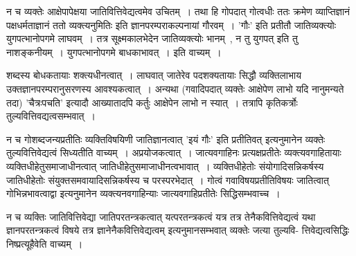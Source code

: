 				न च व्यक्तेः आक्षेपापेक्षया जातिवित्तिवेद्यत्वमेव उचितम्~। तथा हि गोपदात् गोत्वधीः ततः क्रमेण व्याप्तिज्ञानं पक्षधर्मताज्ञानं ततो व्यक्त्यनुमितिः इति ज्ञानपरम्पराकल्पनायां गौरवम्~। 'गौः' इति प्रतीतौ जातिव्यक्त्योः युगपत्भानोपगमे लाघवम्~। तत्र सूक्ष्मकालभेदेन जातिव्यक्त्योः भानम्~, न तु युगपत् इति तु नाशङ्कनीयम्~। युगपत्भानोपगमे बाधकाभावत्~। इति वाच्यम्~।

				शब्दस्य बोधकतायाः शक्त्यधीनत्वात्~। लाघवात् जातेरेव पदशक्यतायाः सिद्धौ व्यक्तिलाभाय उक्तज्ञानपरम्परानुसरणस्य आवश्यकत्वात्~। अन्यथा (गवादिपदात् व्यक्तेः आक्षेपेण लाभो यदि नानुमन्यते तदा) 'चैत्रःपचति' इत्यादौ आख्यातादपि कर्तुः आक्षेपेन लाभो न स्यात्~। तत्रापि कृतिकर्त्रोः तुल्यवित्तिवद्यत्वसम्भवात्~। 

				न च गोशब्दजन्यप्रतीतिः व्यक्तिविषयिणी जातिज्ञानत्वात् 'इयं गौः' इति प्रतीतिवत् इत्यनुमानेन व्यक्तेः तुल्यवित्तिवेद्यत्वं सिध्यतीति वाच्यम्~। अप्रयोजकत्वात्~। जात्यवगाहिनः प्रत्यक्षप्रतीतेः व्यक्त्यवगाहितायाः व्यक्तिधीहेतुसमाजाधीनत्वात् जातिधीहेतुसमाजाधीनत्वभावात्~। व्यक्तिधीहेतोः संयोगादिसन्निकर्षस्य जातिधीहेतोः संयुक्तसमवायादिसन्निकर्षस्य च परस्परभेदात्~। गोत्वं गवाविषयप्रतीतिविषयः जातित्वात् गोभिन्नभावत्वाद्वा इत्यनुमानेन व्यक्त्यनवगाहिन्याः जात्यवगाहिप्रतीतेः सिद्धिसम्भवाच्च~। 

				न च व्यक्तिः जातिवित्तिवेद्या जातिपरतन्त्रकत्वात् यत्परतन्त्रकत्वं यत्र तत्र तेनैकवित्तिवेद्यत्वं यथा ज्ञानपरतन्त्रकत्वं विषये तत्र ज्ञानेनैकवित्तिवेद्यत्वम् इत्यनुमानसम्भवात् व्यक्तेः जत्या तुल्यवि- त्तिवेद्यत्वसिद्धिः निष्प्रत्यूहैवेति वाच्यम्~।

